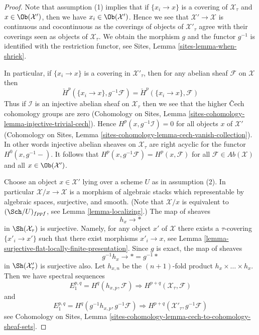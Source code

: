 \begin{proof}
Note that assumption (1) implies that if $\{x_i \to x\}$ is a covering
of $\mathcal{X}_\tau$ and $x \in \Ob(\mathcal{X}')$, then we have
$x_i \in \Ob(\mathcal{X}')$. Hence we see that $\mathcal{X}' \to \mathcal{X}$
is continuous and cocontinuous as the coverings of objects of
$\mathcal{X}'_\tau$ agree with their coverings seen as objects of
$\mathcal{X}_\tau$. We obtain the morphism $g$ and the functor
$g^{-1}$ is identified with the restriction functor, see
Sites, Lemma \ref{sites-lemma-when-shriek}.

\medskip\noindent
In particular, if $\{x_i \to x\}$ is a covering in $\mathcal{X}'_\tau$,
then for any abelian sheaf $\mathcal{F}$ on $\mathcal{X}$ then
$$
\check H^p(\{x_i \to x\}, g^{-1}\mathcal{F}) =
\check H^p(\{x_i \to x\}, \mathcal{F})
$$
Thus if $\mathcal{I}$ is an injective abelian sheaf on $\mathcal{X}_\tau$
then we see that the higher {\v C}ech cohomology groups are zero
(Cohomology on Sites,
Lemma \ref{sites-cohomology-lemma-injective-trivial-cech}).
Hence $H^p(x, g^{-1}\mathcal{I}) = 0$ for all objects $x$
of $\mathcal{X}'$
(Cohomology on Sites,
Lemma \ref{sites-cohomology-lemma-cech-vanish-collection}).
In other words injective abelian sheaves on $\mathcal{X}_\tau$
are right acyclic for the functor $H^0(x, g^{-1}-)$.
It follows that $H^p(x, g^{-1}\mathcal{F}) = H^p(x, \mathcal{F})$
for all $\mathcal{F} \in \textit{Ab}(\mathcal{X})$ and all
$x \in \Ob(\mathcal{X}')$.

\medskip\noindent
Choose an object $x \in \mathcal{X}'$ lying over a scheme $U$
as in assumption (2). In particular $\mathcal{X}/x \to \mathcal{X}$
is a morphism of algebraic stacks which representable by algebraic spaces,
surjective, and smooth. (Note that $\mathcal{X}/x$ is equivalent to
$(\Sch/U)_{fppf}$, see Lemma \ref{lemma-localizing}.)
The map of sheaves
$$
h_x \longrightarrow *
$$
in $\Sh(\mathcal{X}_\tau)$ is surjective. Namely, for any object $x'$
of $\mathcal{X}$ there exists a $\tau$-covering $\{x'_i \to x'\}$
such that there exist morphisms $x'_i \to x$, see
Lemma \ref{lemma-surjective-flat-locally-finite-presentation}.
Since $g$ is exact, the map of sheaves
$$
g^{-1}h_x \longrightarrow * = g^{-1}*
$$
in $\Sh(\mathcal{X}'_\tau)$ is surjective also. Let $h_{x, n}$ be
the $(n + 1)$-fold product $h_x \times \ldots \times h_x$.
Then we have spectral sequences
\begin{equation}
\label{equation-spectral-sequence-one}
E_1^{p, q} = H^q(h_{x, p}, \mathcal{F}) \Rightarrow
H^{p + q}(\mathcal{X}_\tau, \mathcal{F})
\end{equation}
and
\begin{equation}
\label{equation-spectral-sequence-two}
E_1^{p, q} = H^q(g^{-1}h_{x, p}, g^{-1}\mathcal{F}) \Rightarrow
H^{p + q}(\mathcal{X}'_\tau, g^{-1}\mathcal{F})
\end{equation}
see Cohomology on Sites,
Lemma \ref{sites-cohomology-lemma-cech-to-cohomology-sheaf-sets}.


\end{proof}
